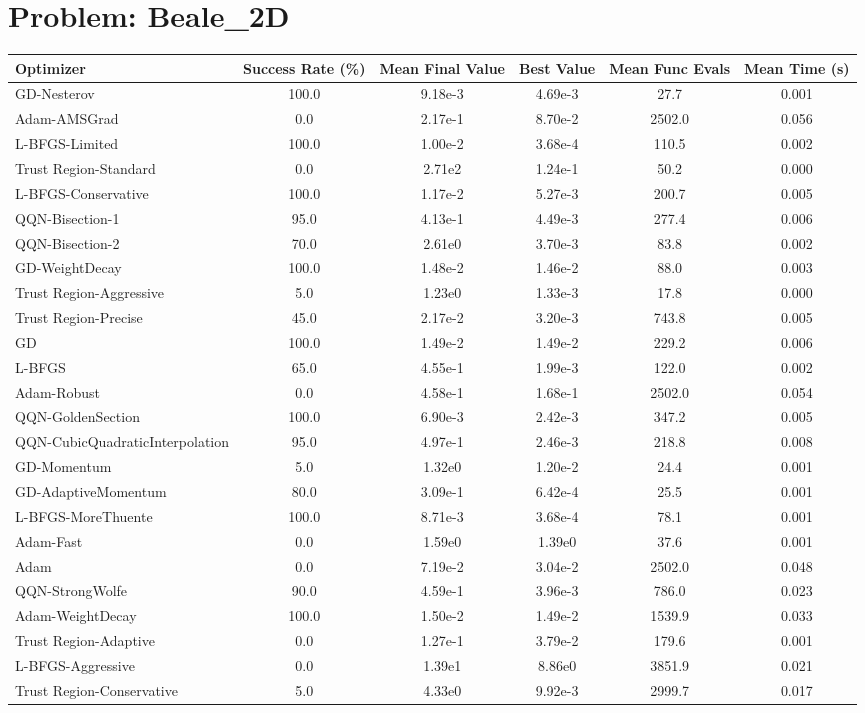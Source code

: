 \documentclass{article}
\begin{document}
\section{Problem: Beale\_2D}
\begin{longtable}{p{3cm}*{5}{c}}
\toprule
\textbf{Optimizer} & \textbf{Success Rate (\%)} & \textbf{Mean Final Value} & \textbf{Best Value} & \textbf{Mean Func Evals} & \textbf{Mean Time (s)} \\
\midrule
GD-Nesterov & 100.0 & 9.18e-3 & 4.69e-3 & 27.7 & 0.001 \\
Adam-AMSGrad & 0.0 & 2.17e-1 & 8.70e-2 & 2502.0 & 0.056 \\
L-BFGS-Limited & 100.0 & 1.00e-2 & 3.68e-4 & 110.5 & 0.002 \\
Trust Region-Standard & 0.0 & 2.71e2 & 1.24e-1 & 50.2 & 0.000 \\
L-BFGS-Conservative & 100.0 & 1.17e-2 & 5.27e-3 & 200.7 & 0.005 \\
QQN-Bisection-1 & 95.0 & 4.13e-1 & 4.49e-3 & 277.4 & 0.006 \\
QQN-Bisection-2 & 70.0 & 2.61e0 & 3.70e-3 & 83.8 & 0.002 \\
GD-WeightDecay & 100.0 & 1.48e-2 & 1.46e-2 & 88.0 & 0.003 \\
Trust Region-Aggressive & 5.0 & 1.23e0 & 1.33e-3 & 17.8 & 0.000 \\
Trust Region-Precise & 45.0 & 2.17e-2 & 3.20e-3 & 743.8 & 0.005 \\
GD & 100.0 & 1.49e-2 & 1.49e-2 & 229.2 & 0.006 \\
L-BFGS & 65.0 & 4.55e-1 & 1.99e-3 & 122.0 & 0.002 \\
Adam-Robust & 0.0 & 4.58e-1 & 1.68e-1 & 2502.0 & 0.054 \\
QQN-GoldenSection & 100.0 & 6.90e-3 & 2.42e-3 & 347.2 & 0.005 \\
QQN-CubicQuadraticInterpolation & 95.0 & 4.97e-1 & 2.46e-3 & 218.8 & 0.008 \\
GD-Momentum & 5.0 & 1.32e0 & 1.20e-2 & 24.4 & 0.001 \\
GD-AdaptiveMomentum & 80.0 & 3.09e-1 & 6.42e-4 & 25.5 & 0.001 \\
L-BFGS-MoreThuente & 100.0 & 8.71e-3 & 3.68e-4 & 78.1 & 0.001 \\
Adam-Fast & 0.0 & 1.59e0 & 1.39e0 & 37.6 & 0.001 \\
Adam & 0.0 & 7.19e-2 & 3.04e-2 & 2502.0 & 0.048 \\
QQN-StrongWolfe & 90.0 & 4.59e-1 & 3.96e-3 & 786.0 & 0.023 \\
Adam-WeightDecay & 100.0 & 1.50e-2 & 1.49e-2 & 1539.9 & 0.033 \\
Trust Region-Adaptive & 0.0 & 1.27e-1 & 3.79e-2 & 179.6 & 0.001 \\
L-BFGS-Aggressive & 0.0 & 1.39e1 & 8.86e0 & 3851.9 & 0.021 \\
Trust Region-Conservative & 5.0 & 4.33e0 & 9.92e-3 & 2999.7 & 0.017 \\
\bottomrule
\end{longtable}
\end{document}

